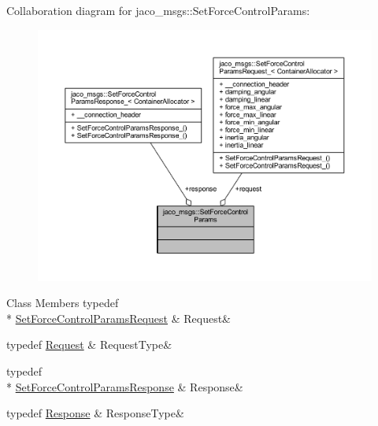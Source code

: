 Collaboration diagram for jaco\+\_\+msgs\+:\+:Set\+Force\+Control\+Params\+:
\nopagebreak
\begin{figure}[H]
\begin{center}
\leavevmode
\includegraphics[width=350pt]{d8/db9/structjaco__msgs_1_1SetForceControlParams__coll__graph}
\end{center}
\end{figure}
\begin{DoxyFields}{Class Members}
typedef \\*
\hyperlink{namespacejaco__msgs_a3486b7826c8a999135bb2eded905e7a8}{Set\+Force\+Control\+Params\+Request}\hypertarget{namespacejaco__msgs_a9960faf4239c20b2de273631be129dc2}{}\label{namespacejaco__msgs_a9960faf4239c20b2de273631be129dc2}
&
Request&
\\
\hline

typedef \hyperlink{namespacejaco__msgs_a9960faf4239c20b2de273631be129dc2}{Request}\hypertarget{namespacejaco__msgs_a11bf11c38ce95c32e8af197dbf30a021}{}\label{namespacejaco__msgs_a11bf11c38ce95c32e8af197dbf30a021}
&
Request\+Type&
\\
\hline

typedef \\*
\hyperlink{namespacejaco__msgs_afebda443b838c4657280c3c24ba107ba}{Set\+Force\+Control\+Params\+Response}\hypertarget{namespacejaco__msgs_a06150f3690c6e365126010e9874be430}{}\label{namespacejaco__msgs_a06150f3690c6e365126010e9874be430}
&
Response&
\\
\hline

typedef \hyperlink{namespacejaco__msgs_a06150f3690c6e365126010e9874be430}{Response}\hypertarget{namespacejaco__msgs_ab21192d50d1ac33e14c818852ed5ee6d}{}\label{namespacejaco__msgs_ab21192d50d1ac33e14c818852ed5ee6d}
&
Response\+Type&
\\
\hline

\end{DoxyFields}
